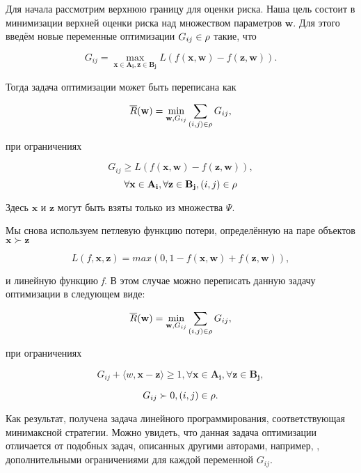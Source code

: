 \documentclass[12pt,a4paper,oneside]{article}
\begin{document}
\begin{multicols}{2}
\par
Для начала рассмотрим верхнюю границу для оценки риска. 
Наша цель состоит в минимизации верхней оценки риска над множеством параметров \(\mathbf{w}\). 
Для этого введём новые переменные оптимизации \(G_{ij} \in \mathrm{\rho}\) такие, что

\[
G_{ij} = \underset{\mathbf{x} \in \mathbf{A_i}, \mathbf{z} \in \mathbf{B_j}}{\operatorname{max}} L (f (\mathbf{x}, \mathbf{w}) - f(\mathbf{z}, \mathbf{w})). 
\]

\par
Тогда задача оптимизации может быть переписана как

\[
\overline{R}(\mathbf{w}) = \underset{\mathbf{w}, G_{ij}}{\operatorname{min}} \sum \limits_{(i, j) \in \mathrm{\rho}} G_{ij},
\]

\par
при ограничениях

\[
G_{ij} \geq L (f(\mathbf{x}, \mathbf{w}) - f(\mathbf{z}, \mathbf{w})), 
\]
\[\forall \mathbf{x} \in \mathbf{A_i}, \forall \mathbf{z} \in \mathbf{B_j}, (i, j) \in \mathrm{\rho}
\]

\par
Здесь \(\mathbf{x}\) и \(\mathbf{z}\) могут быть взяты только из множества \(\Psi\). 

\par
Мы снова используем петлевую функцию потери, определённую на паре объектов \(\mathbf{x} \succ \mathbf{z}\)

\[
L(f, \mathbf{x}, \mathbf{z}) = max (0,1 - f(\mathbf{x}, \mathbf{w}) + f(\mathbf{z}, \mathbf{w})),
\]

\par
и линейную функцию \emph{f}. 
В этом случае можно переписать данную задачу оптимизации в следующем виде:

\[
\overline{R}(\mathbf{w}) = \underset{\mathbf{w}, G_{ij}}{\operatorname{min}} \sum \limits_{(i, j) \in \mathrm{\rho}} G_{ij},
\]

\par
при ограничениях

\[
G_{ij} + \langle w, \mathbf{x} - \mathbf{z} \rangle \geq 1, \forall \mathbf{x} \in \mathbf{A_i}, \forall \mathbf{z} \in \mathbf{B_j}, 
\]

\[
G_{ij} \succ 0, (i, j) \in \mathrm{\rho}.
\]

\par
Как результат, получена задача линейного программирования, соответствующая минимаксной стратегии. 
Можно увидеть, что данная задача оптимизации отличается от подобных задач, описанных другими авторами, например, , дополнительными ограничениями для каждой переменной \(G_{ij}\). 


\end{multicols}
\end{document}
